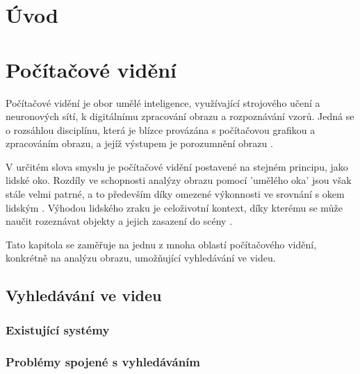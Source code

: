 
%

\chapter{Úvod}
\label{introduction}

\chapter{Počítačové vidění}
\label{computer_vision}
Počítačové vidění je obor umělé inteligence, využívající strojového učení a neuronových sítí, k digitálnímu zpracování obrazu a rozpoznávání vzorů. Jedná se o rozsáhlou disciplínu, která je blízce provázána s počítačovou grafikou a zpracováním obrazu, a jejíž výstupem je porozumnění obrazu \cite{cv_Wiley2018}.

V určitém slova smyslu je počítačové vidění postavené na stejném principu, jako lidské oko. Rozdíly ve schopnosti analýzy obrazu pomocí 'umělého oka' jsou však stále velmi patrné, a to především díky omezené výkonnosti ve srovnání s okem lidským \cite{cv_Wiley2018}. Výhodou lidského zraku je celoživotní kontext, díky kterému se může naučit rozeznávat objekty a jejich zasazení do scény \cite{cv_ibm}.

Tato kapitola se zaměřuje na jednu z mnoha oblastí počítačového vidění, konkrétně na analýzu obrazu, umožňující vyhledávání ve videu.

\section{Vyhledávání ve videu}
\subsection{Existující systémy}
\subsection{Problémy spojené s vyhledáváním}
